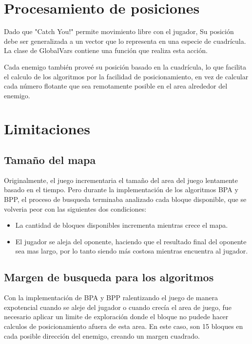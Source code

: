 \documentclass{article}
\begin{document}


\section{Procesamiento de posiciones}

Dado que "Catch You!" permite movimiento libre con el jugador, Su posición debe ser generalizada a un vector que lo representa en una especie de cuadrícula.
La clase de GlobalVars contiene una función que realiza esta acción.



Cada enemigo también proveé su posición basado en la cuadrícula, lo que facilita el calculo de los algoritmos por la facilidad de posicionamiento, en vez de calcular
cada número flotante que sea remotamente posible en el area alrededor del enemigo.



\section{Limitaciones}

\subsection{Tamaño del mapa}

Originalmente, el juego incrementaria el tamaño del area del juego lentamente basado en el tiempo. Pero durante la
implementación de los algoritmos BPA y BPP, el proceso de busqueda terminaba analizado cada bloque disponible, que se volveria
peor con las siguientes dos condiciones:
\begin{itemize}
    \item La cantidad de bloques disponibles incrementa mientras crece el mapa.
    \item El jugador se aleja del oponente, haciendo que el resultado final del oponente sea mas largo, por lo tanto
    siendo más costosa mientras encuentra al jugador.
\end{itemize}

\subsection{Margen de busqueda para los algoritmos}

Con la implementación de BPA y BPP ralentizando el juego de manera expotencial cuando se aleje del jugador o cuando crecía el
area de juego, fue necesario aplicar un limite de exploración donde el bloque no pudede hacer calculos de posicionamiento
afuera de esta area. En este caso, son 15 bloques en cada posible dirección del enemigo, creando un margen cuadrado.


\end{document}

